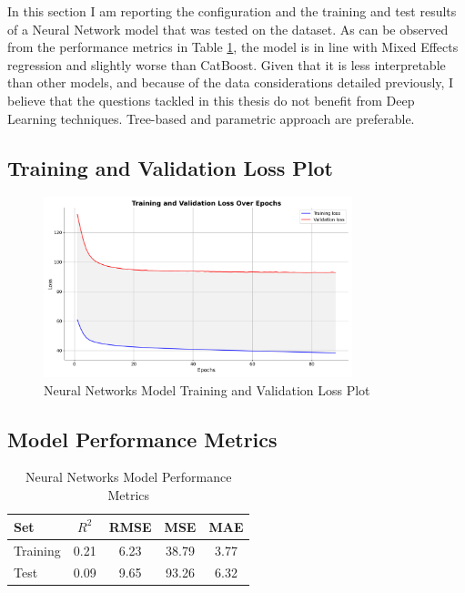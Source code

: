 In this section I am reporting the configuration and the training and test results of a Neural Network model that was tested on the dataset. As can be observed from the performance metrics in Table \ref{tab:neural_networks_performance}, the model is in line with Mixed Effects regression and slightly worse than CatBoost. Given that it is less interpretable than other models, and because of the data considerations detailed previously, I believe that the questions tackled in this thesis do not benefit from Deep Learning techniques. Tree-based and parametric approach are preferable.

\subsection{Training and Validation Loss Plot}

\begin{figure}[H]
    \centering
    \includegraphics[width=0.8\textwidth]{figures/nn_training_loss.png}
    \caption{Neural Networks Model Training and Validation Loss Plot}
    \label{fig:neural_networks_loss_plot}
\end{figure}


\subsection{Model Performance Metrics}

\begin{table}[H]
    \centering
    \caption{Neural Networks Model Performance Metrics}
    \label{tab:neural_networks_performance}
    \begin{tabular}{lcccc}
    \hline
    Set & $R^2$ & RMSE & MSE & MAE \\ 
    \hline
    Training & 0.21 & 6.23 & 38.79 & 3.77 \\
    Test & 0.09 & 9.65 & 93.26 & 6.32 \\
    \hline
    \end{tabular}

\end{table}

